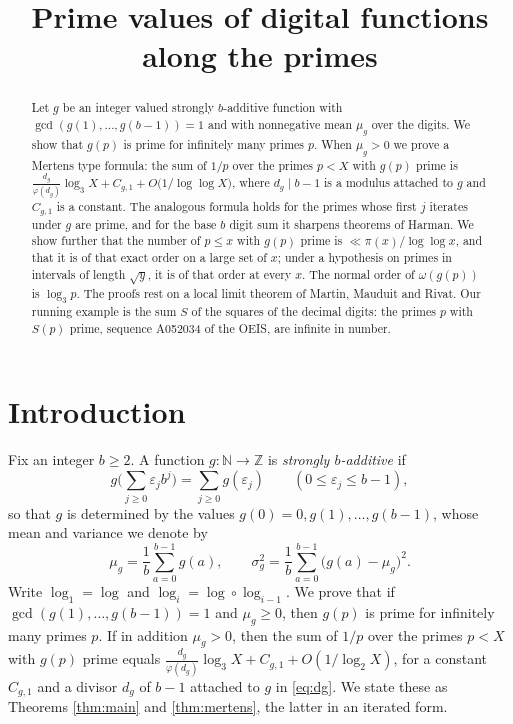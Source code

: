 \documentclass[11pt,reqno]{amsart}
\theoremstyle{plain}
\theoremstyle{definition}
\newcommand{\N}{\mathbb{N}}
\newcommand{\Z}{\mathbb{Z}}
\begin{document}
\title[Prime values of digital functions]{Prime values of digital functions along the primes}


\date{}


\begin{abstract}
Let $g$ be an integer valued strongly $b$-additive function with $\gcd(g(1),\dots,g(b-1))=1$ and with nonnegative mean $\mu_g$ over the digits. We show that $g(p)$ is prime for infinitely many primes $p$. When $\mu_g>0$ we prove a Mertens type formula: the sum of $1/p$ over the primes $p<X$ with $g(p)$ prime is $\frac{d_g}{\varphi(d_g)}\log_3X+C_{g,1}+O\big(1/\log\log X\big)$, where $d_g\mid b-1$ is a modulus attached to $g$ and $C_{g,1}$ is a constant. The analogous formula holds for the primes whose first $j$ iterates under $g$ are prime, and for the base $b$ digit sum it sharpens theorems of Harman. We show further that the number of $p\le x$ with $g(p)$ prime is $\ll\pi(x)/\log\log x$, and that it is of that exact order on a large set of $x$; under a hypothesis on primes in intervals of length $\sqrt y$, it is of that order at every $x$. The normal order of $\omega(g(p))$ is $\log_3p$. The proofs rest on a local limit theorem of Martin, Mauduit and Rivat. Our running example is the sum $S$ of the squares of the decimal digits: the primes $p$ with $S(p)$ prime, sequence A052034 of the OEIS, are infinite in number.
\end{abstract}

\maketitle

\section{Introduction}

Fix an integer $b\ge 2$. A function $g\colon \N\to\Z$ is \emph{strongly $b$-additive} if
\[
g\Big(\sum_{j\ge 0}\varepsilon_j b^{j}\Big)=\sum_{j\ge 0}g(\varepsilon_j)\qquad (0\le \varepsilon_j\le b-1),
\]
so that $g$ is determined by the values $g(0)=0,g(1),\dots,g(b-1)$, whose mean and variance we denote by
\[
\mu_g=\frac1b\sum_{a=0}^{b-1}g(a),\qquad
\sigma_g^2=\frac1b\sum_{a=0}^{b-1}\big(g(a)-\mu_g\big)^2 .
\]
Write $\log_1=\log$ and $\log_{i}=\log\circ\log_{i-1}$. We prove that if $\gcd(g(1),\dots,g(b-1))=1$ and $\mu_g\ge0$, then $g(p)$ is prime for infinitely many primes $p$. If in addition $\mu_g>0$, then the sum of $1/p$ over the primes $p<X$ with $g(p)$ prime equals $\frac{d_g}{\varphi(d_g)}\log_3X+C_{g,1}+O(1/\log_2X)$, for a constant $C_{g,1}$ and a divisor $d_g$ of $b-1$ attached to $g$ in \eqref{eq:dg}. We state these as Theorems \ref{thm:main} and \ref{thm:mertens}, the latter in an iterated form.
\end{document}

